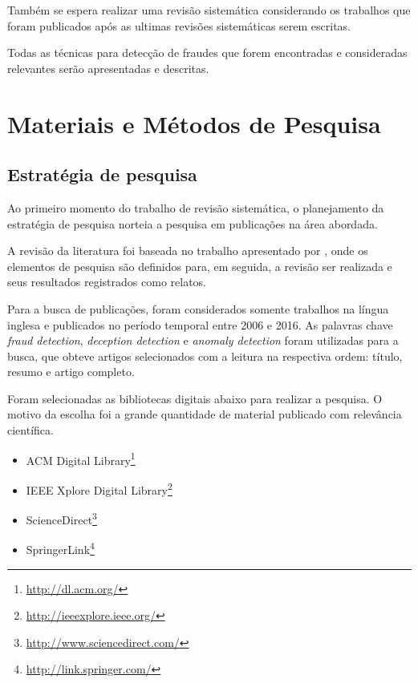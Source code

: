 \documentclass[smallextended]{svjour3}       %
\begin{document}
Também se espera realizar uma revisão sistemática considerando os trabalhos que foram publicados após as ultimas revisões sistemáticas serem escritas.

Todas as técnicas para detecção de fraudes que forem encontradas e consideradas relevantes serão apresentadas e descritas.

\section{Materiais e Métodos de Pesquisa}
\label{sec:1}

\subsection{Estratégia de pesquisa}
\label{sec:2}

Ao primeiro momento do trabalho de revisão sistemática, o planejamento da estratégia de pesquisa norteia a pesquisa em publicações na área abordada.

A revisão da literatura foi baseada no trabalho apresentado por \cite{Kitchenham07guidelinesfor}, onde os elementos de pesquisa são definidos para, em seguida, a revisão ser realizada e seus resultados registrados como relatos.

Para a busca de publicações, foram considerados somente trabalhos na língua inglesa e publicados no período temporal entre 2006 e 2016. As palavras chave \emph{fraud detection}, \emph{deception detection} e \emph{anomaly detection} foram utilizadas para a busca, que obteve artigos selecionados com a leitura na respectiva ordem: título, resumo e artigo completo. 

Foram selecionadas as bibliotecas digitais abaixo para realizar a pesquisa. O motivo da escolha foi a grande quantidade de material publicado com relevância científica.

\begin{itemize}
	\item \textsf{ACM Digital Library}\footnote{\url{http://dl.acm.org/}}
	
	\item \textsf{IEEE Xplore Digital Library}\footnote{\url{http://ieeexplore.ieee.org/}}
	
	\item \textsf{ScienceDirect}\footnote{\url{http://www.sciencedirect.com/}} 	
	
	\item \textsf{SpringerLink}\footnote{\url{http://link.springer.com/}}
\end{itemize}
\end{document}
